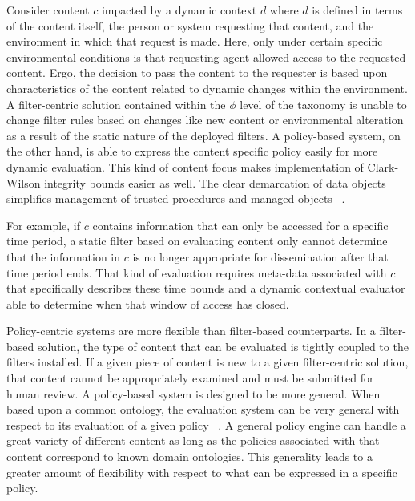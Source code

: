 Consider content $c$ impacted by a dynamic context $d$ where $d$ is defined in terms of the content itself, the person or system requesting that content, and the environment in which that request is made.  Here, only under certain specific environmental conditions is that requesting agent allowed access to the requested content.  Ergo, the decision to pass the content to the requester is based upon characteristics of the content related to dynamic changes within the environment.  A filter-centric solution contained within the $\phi$ level of the taxonomy is unable to change filter rules based on changes like new content or environmental alteration as a result of the static nature of the deployed filters.  A policy-based system, on the other hand, is able to express the content specific policy easily for more dynamic evaluation.  This kind of content focus makes implementation of Clark-Wilson integrity bounds easier as well.  The clear demarcation of data objects simplifies management of trusted procedures and managed objects ~\cite{ClaWil87}.

For example, if $c$ contains information that can only be accessed for a specific time period, a static filter based on evaluating content only cannot determine that the information in $c$ is no longer appropriate for dissemination after that time period ends.  That kind of evaluation requires meta-data associated with $c$ that specifically describes these time bounds and a dynamic contextual evaluator able to determine when that window of access has closed.

Policy-centric systems are more flexible than filter-based counterparts.  In a filter-based solution, the type of content that can be evaluated is tightly coupled to the filters installed.  If a given piece of content is new to a given filter-centric solution, that content cannot be appropriately examined and must be submitted for human review.  A policy-based system is designed to be more general.  When based upon a common ontology, the evaluation system can be very general with respect to its evaluation of a given policy ~\cite{JaHeLa:10}.  A general policy engine can handle a great variety of different content as long as the policies associated with that content correspond to known domain ontologies.  This generality leads to a greater amount of flexibility with respect to what can be expressed in a specific policy.

